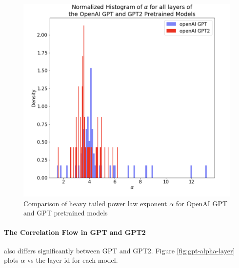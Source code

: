 \begin{figure}
   \includegraphics[scale=0.25]{img/gpt-alpha-hist.png}
   \caption{Comparison of heavy tailed power law exponent $\alpha$ for OpenAI GPT and GPT pretrained models}

   \label{fig:gpt-alphs-hist}
\end{figure}


\paragraph{The Correlation Flow in GPT and GPT2} also differs significantly between GPT and GPT2.
Figure \ref{fig:gpt-alpha-layer} plots $\alpha$ vs the layer id for each model.



